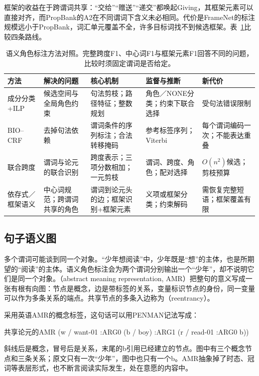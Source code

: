 框架的收益在于跨谓词共享：“交给”“赠送”“递交”都唤起Giving，其框架元素可以直接对齐，而PropBank的A2在不同谓词下含义未必相同。代价是FrameNet的标注规模远小于PropBank，词汇单元覆盖不全，许多目标词找不到候选框架。表~\ref{tab:nlp-analysis-srl-methods}比较四条路线。

\begin{table}[htbp]
  \centering
  \begin{tabularx}{\linewidth}{@{}l XXXX@{}}
    \toprule
    方法&解决的问题&核心机制&监督与推断&新代价\\
    \midrule
    成分分类+ILP&候选空间与全局角色约束&句法剪枝；路径特征；整数规划&角色／NONE分类；约束下联合选择&受句法错误限制\\
    BIO--CRF&去掉句法依赖&谓词条件的序列标注；合法转移掩码&参考标签序列；Viterbi&每个谓词编码一次；不能表达重叠\\
    联合跨度&谓词与论元的联合识别&跨度表示；三项分数相加；一元剪枝&谓词、跨度、角色；配对选择&$O(n^2)$候选；剪枝预算\\
    依存式／框架语义&中心词规范；跨谓词共享的角色&谓词到论元头的边；框架识别+框架元素&义项或框架分类；约束解码&需恢复完整短语；框架覆盖有限\\
    \bottomrule
  \end{tabularx}
  \caption{语义角色标注方法对照。完整跨度F1、中心词F1与框架元素F1回答不同的问题，比较时须固定谓词是否给定。}
  \label{tab:nlp-analysis-srl-methods}
\end{table}

\subsection{句子语义图}
\label{sec:nlp-analysis-amr}

多个谓词可能谈到同一个对象。“少年想阅读”中，少年既是“想”的主体，也是所期望的“阅读”的主体。语义角色标注会为两个谓词分别输出一个“少年”，却不说明它们是同一个对象。（abstract meaning representation, AMR）把整句的意义写成一张有根有向图：节点是概念，边是带标签的关系，变量标识节点的身份，同一变量可以作为多条关系的端点。共享节点的多条入边称为（reentrancy）。

采用英语AMR的概念标签，这句话可以用PENMAN记法写成：
\begin{codeblock}{共享论元的AMR}
(w / want-01
   :ARG0 (b / boy)
   :ARG1 (r / read-01
            :ARG0 b))
\end{codeblock}
斜线后是概念，冒号后是关系，末尾的b引用已经建立的节点。图中有三个概念节点和三条关系；原文只有一次“少年”，图中也只有一个b。AMR抽象掉了时态、冠词等表层形式，也不断言阅读实际发生，处在意愿的内容中。

